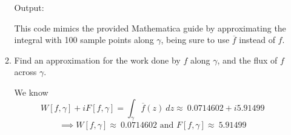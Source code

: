 \documentclass{article}
\begin{document}
\begin{enumerate}
\begin{enumerate}
		
		Output: 
		
		This code mimics the provided Mathematica guide by approximating the integral with 100 sample points along $\gamma$, being sure to use $\overline{f}$ instead of $f$.
		
		\item Find an approximation for the work done by $f$ along $\gamma$, and the flux of $f$ across $\gamma$.
		
		We know 
		\[W[f,\gamma]+iF[f,\gamma]=\int_{\gamma}\overline{f}(z)\ dz\approx\ 0.0714602 + i 5.91499 \]
		\[\implies W[f,\gamma]\approx\ 0.0714602 \text{ and } F[f,\gamma]\approx\ 5.91499 \]
	\end{enumerate}
\end{enumerate}

\end{document}
